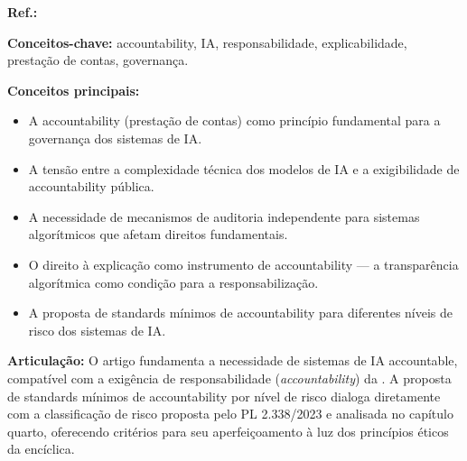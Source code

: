 \begin{fichamento}
    \textbf{Ref.:} \cite{DoshiVelez2017MAR}
    
    \textbf{Conceitos-chave:} accountability, IA, responsabilidade, explicabilidade, prestação de contas, governança.
    
    \textbf{Conceitos principais:}
    \begin{itemize}
        \item A accountability (prestação de contas) como princípio fundamental para a governança dos sistemas de IA.
        \item A tensão entre a complexidade técnica dos modelos de IA e a exigibilidade de accountability pública.
        \item A necessidade de mecanismos de auditoria independente para sistemas algorítmicos que afetam direitos fundamentais.
        \item O direito à explicação como instrumento de accountability — a transparência algorítmica como condição para a responsabilização.
        \item A proposta de standards mínimos de accountability para diferentes níveis de risco dos sistemas de IA.
    \end{itemize}
    
    \textbf{Articulação:} O artigo fundamenta a necessidade de sistemas de IA accountable, compatível com a exigência de responsabilidade (\textit{accountability}) da \MH{}. A proposta de standards mínimos de accountability por nível de risco dialoga diretamente com a classificação de risco proposta pelo PL 2.338/2023 e analisada no capítulo quarto, oferecendo critérios para seu aperfeiçoamento à luz dos princípios éticos da encíclica.
\end{fichamento}

